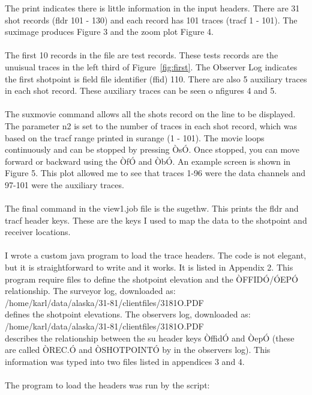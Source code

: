 The print indicates there is little information in the input headers.  There are 31 shot records (fldr 101 - 130) and each record has 101 traces (tracf 1 - 101).  The suximage produces Figure 3 and the zoom plot Figure 4.\\
\\
The first 10 records in the file are test records.  These tests records are the unuisual traces in the left third of Figure~\ref{fig:first}. The Observer Log indicates the first shotpoint is field file identifier (ffid) 110.  There are also 5 auxiliary traces in each shot record.  These auxiliary traces can be seen o nfigures 4 and 5. \\
\\
The suxmovie command allows all the shots record on the line to be displayed.  The parameter n2 is set to the number of traces in each shot record, which was based on the tracf range printed in surange (1 - 101).  The movie loops continuously and can be stopped by pressing ÒsÓ.  Once stopped, you can move forward or backward using the ÒfÓ and ÒbÓ.  An example screen is shown in Figure 5.  This plot allowed me to see that traces 1-96 were the data channels and 97-101 were the auxiliary traces.\\
\\
The final command in the view1.job file is the sugethw.  This prints the fldr and tracf header keys.  These are the keys I used to map the data to the shotpoint and receiver locations.\\
\\
I wrote a custom java program to load the trace headers.  The code is not elegant, but it is straightforward to write and it works.  It is listed in Appendix 2.  This program require files to define the shotpoint elevation and the ÒFFIDÓ/ÓEPÓ relationship.  The surveyor log, downloaded as:\\
/home/karl/data/alaska/31-81/clientfiles/3181O.PDF \\
defines the shotpoint elevations.  The observers log, downloaded as:\\
/home/karl/data/alaska/31-81/clientfiles/3181O.PDF \\
describes the relationship between the su header keys ÒffidÓ  and ÒepÓ  (these are called ÒREC.Ó and ÒSHOTPOINTÓ by in the observers log).   This information was typed into two files listed in appendices 3 and 4.\\
\\
The program to load the headers was run by the script:\\
